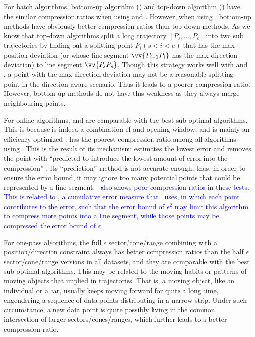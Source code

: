 For batch algorithms, bottom-up algorithm (\tpa) and top-down algorithm (\dpa) have the similar compression ratios when using \ped and \sed. However, when using \dad, bottom-up methods have obviously better compression ratios than top-down methods.  As we know that top-down algorithms split a long trajectory $[P_s, ..., P_e]$ into two sub trajectories by finding out a splitting point $P_i (s<i<e)$ that has the max position deviation (or whose line segment $\vv{P_{i-1}P_{i}}$ has the max direction deviation) to line segment $\vv{P_sP_{e}}$. Though this strategy works well with \ped and \sed, a point with the max direction deviation may not be a reasonable splitting point in the direction-aware scenario. Thus it leads to a poorer compression ratio. However, bottom-up methods do not have this weakness as they always merge neighbouring points.



For online algorithms, \bqsa and \opwa are comparable with the best sub-optimal algorithms. This is because \opwa is indeed a combination of \dpa and opening window, and \bqsa is mainly an efficiency optimized \opwa.
\squishe has the poorest compression ratio among all algorithms using \sed. This is the result of its mechanism: \squishe estimates the lowest \sed error and removes the point with ``predicted to introduce the lowest amount of error into the compression'' \cite{Muckell:SQUISH}. Its ``prediction'' method is not accurate enough, thus, in order to ensure the error bound, it may ignore too many potential points that could be represented by a line segment. \textcolor{blue}{\dagots~also shows poor compression ratios in these tests. This is related to \lissed, a cumulative error measure that \dagots~uses, in which each point contributes to the error, such that the \lissed error bound of $\epsilon^2$ may limit this algorithm to compress more points into a line segment, while those points may be compressed \wrt the  \sed error bound of $\epsilon$.}

For one-pass algorithms, the full $\epsilon$ sector/cone/range combining with a position/direction constraint always has better compression ratios than the half $\epsilon$ sector/cone/range versions in all datasets, and they are comparable with the best sub-optimal algorithms.
This may be related to the moving habits or patterns of moving objects that implied in trajectories.
That is, a moving object, like an individual or a car, usually keeps moving forward for quite a long time, engendering a sequence of data points distributing in a narrow strip. Under such circumstance, a new data point is quite possibly living in the common intersection of larger sectors/cones/ranges, which further leads to a better compression ratio.

